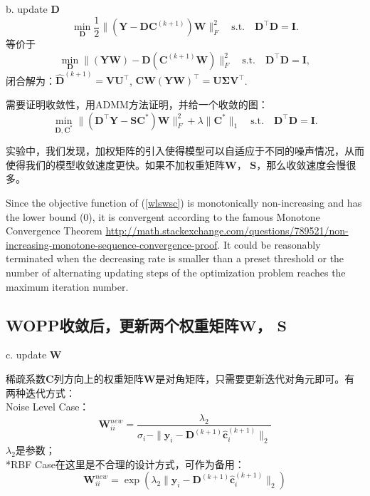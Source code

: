 \documentclass[10pt,twocolumn,letterpaper]{article}
\begin{document}
b. update $\mathbf{D}$
\begin{equation}
\min_{\mathbf{D}}\frac{1}{2}\|(\mathbf{Y}-\mathbf{D}\mathbf{C}^{(k+1)})\mathbf{W}\|_{F}^{2}
\quad
\text{s.t.}
\quad
\mathbf{D}^{\top}\mathbf{D} =\mathbf{I}. 
\end{equation}
等价于
\begin{equation}
\min_{\mathbf{D}}\|(\mathbf{Y}\mathbf{W})-\mathbf{D}(\mathbf{C}^{(k+1)}\mathbf{W})\|_{F}^{2}
\quad
\text{s.t.}
\quad
\mathbf{D}^{\top}\mathbf{D} = \mathbf{I},
\end{equation}
闭合解为：$\hat{\mathbf{D}}^{(k+1)}=\mathbf{V}\mathbf{U}^{\top}$, $\mathbf{C}\mathbf{W}(\mathbf{Y}\mathbf{W})^{\top}=\mathbf{U}\mathbf{\Sigma}\mathbf{V}^{\top}$.

需要证明收敛性，用ADMM方法证明，并给一个收敛的图：
\begin{equation}
\min_{\mathbf{D},\mathbf{C}^{*}}\|(\mathbf{D}^{\top}\mathbf{Y}-\mathbf{S}\mathbf{C}^{*})\mathbf{W}\|_{F}^{2} 
+
\lambda\|\mathbf{C}^{*}\|_{1}
\quad
\text{s.t.}
\quad
\mathbf{D}^{\top}\mathbf{D} = \mathbf{I}.
\end{equation}

实验中，我们发现，加权矩阵的引入使得模型可以自适应于不同的噪声情况，从而使得我们的模型收敛速度更快。如果不加权重矩阵$\mathbf{W}$， $\mathbf{S}$，那么收敛速度会慢很多。

Since the objective function of (\ref{wlswsc}) is monotonically non-increasing and has the lower bound (0), it is convergent according to the famous Monotone Convergence Theorem \cite{stein2009real} \url{http://math.stackexchange.com/questions/789521/non-increasing-monotone-sequence-convergence-proof}. It could be reasonably terminated when the decreasing rate is smaller than a preset threshold or the number of alternating updating steps of the optimization problem reaches the maximum iteration number. 

\subsection{WOPP收敛后，更新两个权重矩阵$\mathbf{W}$， $\mathbf{S}$}
c. update $\mathbf{W}$

稀疏系数$\mathbf{C}$列方向上的权重矩阵$\mathbf{W}$是对角矩阵，只需要更新迭代对角元即可。有两种迭代方式：
\\
Noise Level Case：
\begin{equation}
\mathbf{W}_{ii}^{new}=\frac{\lambda_{2}}{\sigma_{i}-\|\mathbf{y}_{i}-\mathbf{D}^{(k+1)}\hat{\mathbf{c}}_{i}^{(k+1)}\|_{2}}
\end{equation}
$\lambda_{2}$是参数；
\\
*RBF Case在这里是不合理的设计方式，可作为备用：
\begin{equation}
\mathbf{W}_{ii}^{new}=\exp(\lambda_{2}\|\mathbf{y}_{i}-\mathbf{D}^{(k+1)}\hat{\mathbf{c}}_{i}^{(k+1)}\|_{2})
\end{equation}
\end{document}
